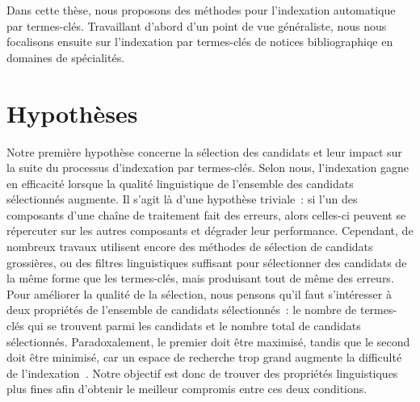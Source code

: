     Dans cette thèse, nous proposons des méthodes pour l'indexation automatique
    par termes-clés. Travaillant d'abord d'un point de vue généraliste, nous
    nous focalisons ensuite sur l'indexation par termes-clés de notices
    bibliographiqe en domaines de spécialités.


  \section{Hypothèses}
  \label{sec:main-introduction-hypothesis}
    Notre première hypothèse concerne la sélection des candidats et leur impact
    sur la suite du processus d'indexation par termes-clés. Selon nous,
    l'indexation gagne en efficacité lorsque la qualité linguistique de
    l'ensemble des candidats sélectionnés augmente.
    Il s'agit là d'une hypothèse triviale~: si l'un des composants d'une chaîne
    de traitement fait des erreurs, alors celles-ci peuvent se répercuter sur
    les autres composants et dégrader leur performance. Cependant, de nombreux
    travaux utilisent encore des méthodes de sélection de candidats grossières,
    ou des filtres linguistiques suffisant pour sélectionner des candidats
    de la même forme que les termes-clés, mais produisant tout de même des
    erreurs.
    Pour améliorer la qualité de la sélection, nous pensons qu'il faut
    s'intéresser à deux propriétés de l'ensemble de candidats sélectionnés~: le
    nombre de termes-clés qui se trouvent parmi les candidats et le nombre total
    de candidats sélectionnés. Paradoxalement, le premier doit être maximisé,
    tandis que le second doit être minimisé, car un espace de recherche trop
    grand augmente la difficulté de
    l'indexation~\cite{hasan2014state_of_the_art}.
    Notre objectif est donc de trouver des propriétés linguistiques plus fines
    afin d'obtenir le meilleur compromis entre ces deux conditions.
    
